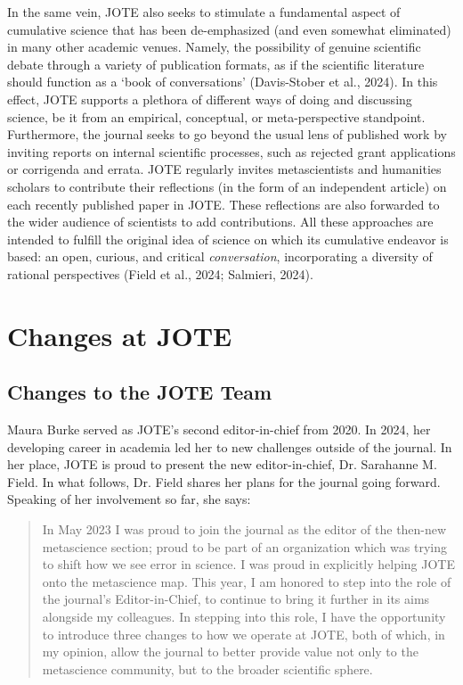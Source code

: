 \documentclass[authordate, empirical]{jote-new-article}
\begin{document}
	In the same vein, JOTE also seeks to stimulate a fundamental aspect of cumulative science that has been de-emphasized (and even somewhat eliminated) in many other academic venues. Namely, the possibility of genuine scientific debate through a variety of publication formats, as if the scientific literature should function as a ‘book of conversations' (Davis-Stober et al., 2024). In this effect, JOTE supports a plethora of different ways of doing and discussing science, be it from an empirical, conceptual, or meta-perspective standpoint. Furthermore, the journal seeks to go beyond the usual lens of published work by inviting reports on internal scientific processes, such as rejected grant applications or corrigenda and errata. JOTE regularly invites metascientists and humanities scholars to contribute their reflections (in the form of an independent article) on each recently published paper in JOTE. These reflections are also forwarded to the wider audience of scientists to add contributions. All these approaches are intended to fulfill the original idea of science on which its cumulative endeavor is based: an open, curious, and critical \emph{conversation}, incorporating a diversity of rational perspectives (Field et al., 2024; Salmieri, 2024).



	\section{Changes at JOTE}



	\subsection{Changes to the JOTE Team}



	Maura Burke served as JOTE's second editor-in-chief from 2020. In 2024, her developing career in academia led her to new challenges outside of the journal. In her place, JOTE is proud to present the new editor-in-chief, Dr. Sarahanne M. Field. In what follows, Dr. Field shares her plans for the journal going forward. Speaking of her involvement so far, she says:


\begin{quote}
	In May 2023 I was proud to join the journal as the editor of the then-new metascience section; proud to be part of an organization which was trying to shift how we see error in science. I was proud in explicitly helping JOTE onto the metascience map. This year, I am honored to step into the role of the journal's Editor-in-Chief, to continue to bring it further in its aims alongside my colleagues. In stepping into this role, I have the opportunity to introduce three changes to how we operate at JOTE, both of which, in my opinion, allow the journal to better provide value not only to the metascience community, but to the broader scientific sphere.

    
\end{quote}
\end{document}
